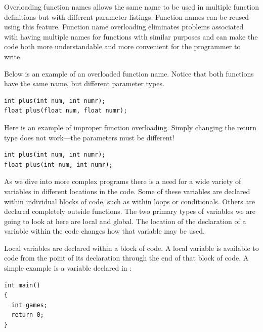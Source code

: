 
Overloading function names allows the same name to be used in multiple function definitions but with different parameter listings. 
Function names can be reused using this feature. 
Function name overloading eliminates problems associated with having multiple names for functions with similar purposes and can make the code both more understandable and more convenient for the programmer to write.

Below is an example of an overloaded function name. 
Notice that both functions have the same name, but different parameter types. \nopagebreak[1]

\noindent\begin{minipage}{\linewidth}\begin{lstlisting}
int plus(int num, int numr);
float plus(float num, float numr);
\end{lstlisting}\end{minipage}

Here is an example of improper function overloading. 
Simply changing the return type does not work---the parameters must be different!

\noindent\begin{minipage}{\linewidth}\begin{lstlisting}
int plus(int num, int numr);
float plus(int num, int numr);  
\end{lstlisting}\end{minipage}



As we dive into more complex programs there is a need for a wide variety of variables in different locations in the code. 
Some of these variables are declared within individual blocks of code, such as within loops or conditionals. 
Others are declared completely outside functions. 
The two primary types of variables we are going to look at here are local and global. 
The location of the declaration of a variable within the code changes how that variable may be used.
	
Local variables are declared within a block of code. 
A local variable is available to code from the point of its declaration through the end of that block of code. 
A simple example is a variable declared in :

\noindent\begin{minipage}{\linewidth}\begin{lstlisting}
int main()
{
  int games;
  return 0;
}
\end{lstlisting}\end{minipage}


